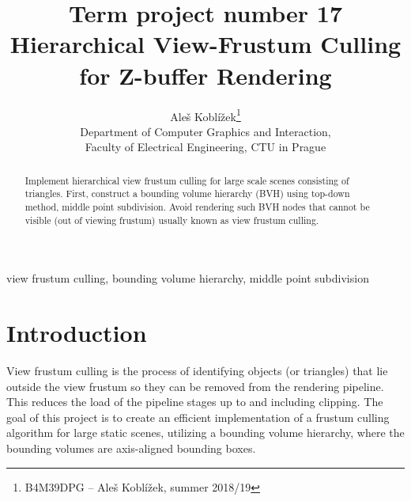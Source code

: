 \documentclass[report,11pt]{elsarticle}
\begin{document}
\begin{frontmatter}

\title{Term project number 17\\ Hierarchical View-Frustum Culling for Z-buffer Rendering}

\author{Aleš Koblížek\footnote{B4M39DPG -- Aleš Koblížek, summer 2018/19}\\
Department of Computer Graphics and Interaction,\\ Faculty of Electrical Engineering, CTU in Prague
}

\date{}


\begin{abstract}
Implement hierarchical view frustum culling for large scale scenes consisting of triangles. First, construct a bounding volume hierarchy (BVH) using top-down method, middle point subdivision. Avoid rendering such BVH nodes that cannot be visible (out of viewing frustum) usually known as view frustum culling.
\end{abstract}

\begin{keyword}
view frustum culling, bounding volume hierarchy, middle point subdivision
\end{keyword}

\end{frontmatter}



\section{\label{SEC:Intro}Introduction}
View frustum culling is the process of identifying objects (or triangles) that lie outside the view frustum so they can be removed from the rendering pipeline. This reduces the load of the pipeline stages up to and including clipping. 
The goal of this project is to create an efficient implementation of a frustum culling algorithm for large static scenes, utilizing a bounding volume hierarchy, where the bounding volumes are axis-aligned bounding boxes.
\end{document}

